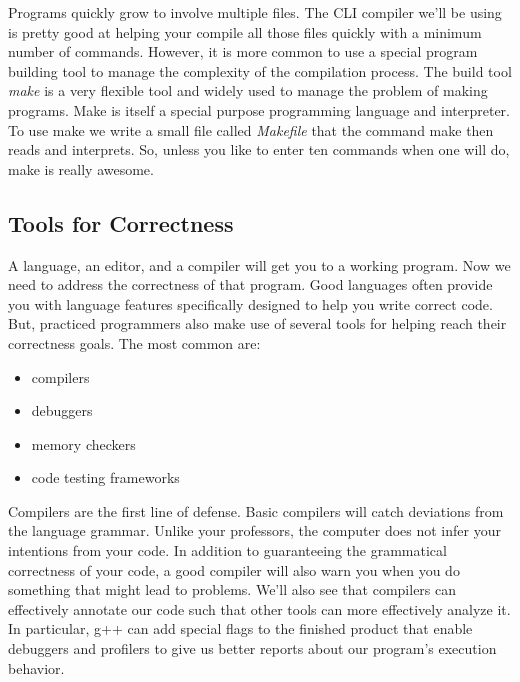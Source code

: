 \documentclass[]{tufte-handout}
\begin{document}
Programs quickly grow to involve multiple files. The CLI compiler we'll be using is pretty good at helping your compile all those files quickly with a minimum number of commands. However, it is more common to use a special program building tool to manage the complexity of the compilation process. The build tool \textit{make} is a very flexible tool and widely used to manage the problem of making programs.  Make is itself a special purpose programming language and interpreter. To use make we write a small file called \textit{Makefile} that the command make then reads and interprets.  So, unless you like to enter ten commands when one will do, make is really awesome.  



\subsection{Tools for Correctness}

A language, an editor, and a compiler will get you to a working program. Now we need to address the correctness of that program. Good languages often provide you with language features specifically designed to help you write correct code. But, practiced programmers also make use of several tools for helping reach their correctness goals.  The most common are:
\begin{itemize}
\item compilers
\item debuggers
\item memory checkers
\item code testing frameworks
\end{itemize}

Compilers are the first line of defense.  Basic compilers will catch deviations from the language grammar.  Unlike your professors, the computer does not infer your intentions from your code.  In addition to guaranteeing the grammatical correctness of your code, a good compiler will also warn you when you do something that might lead to problems.  We'll also see that compilers can effectively annotate our code such that other tools can more effectively analyze it. In particular, g++ can add special flags to the finished product that enable debuggers and profilers to give us better reports about our program's execution behavior.
\end{document}
